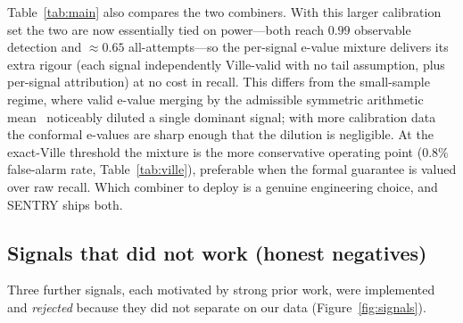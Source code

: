 \documentclass[pdflatex,sn-mathphys-num]{sn-jnl}%
\theoremstyle{thmstyleone}%
\theoremstyle{thmstyletwo}%
\theoremstyle{thmstylethree}%
\begin{document}
Table~\ref{tab:main} also compares the two combiners. With this larger
calibration set the two are now essentially tied on power---both reach
\(0.99\) observable detection and \(\approx\!0.65\) all-attempts---so the
per-signal e-value mixture delivers its extra rigour (each signal
independently Ville-valid with no tail assumption, plus per-signal
attribution) at no cost in recall. This differs from the small-sample regime,
where valid e-value merging by the admissible symmetric arithmetic
mean~\cite{vovk2021evalues} noticeably diluted a single dominant signal; with
more calibration data the conformal e-values are sharp enough that the
dilution is negligible. At the exact-Ville threshold the mixture is the more
conservative operating point (\(0.8\%\) false-alarm rate, Table~\ref{tab:ville}),
preferable when the formal guarantee is valued over raw recall. Which combiner
to deploy is a genuine engineering choice, and SENTRY ships both.

\subsection{Signals that did not work (honest negatives)}\label{sec:negatives}

Three further signals, each motivated by strong prior work, were implemented
and \emph{rejected} because they did not separate on our data
(Figure~\ref{fig:signals}).
\end{document}
